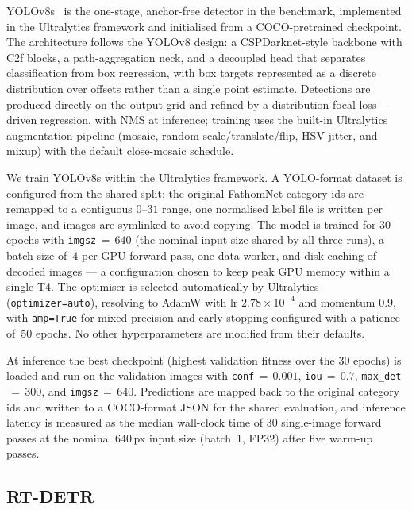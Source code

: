 \documentclass[11pt,a4paper,twocolumn]{article}
\begin{document}
YOLOv8s~\cite{yolov8_2023} is the one-stage, anchor-free detector in the
benchmark, implemented in the Ultralytics framework and initialised from a
COCO-pretrained checkpoint. The architecture follows the YOLOv8 design: a
CSPDarknet-style backbone with C2f blocks, a path-aggregation neck, and a
decoupled head that separates classification from box regression, with box
targets represented as a discrete distribution over offsets rather than a
single point estimate. Detections are produced directly on the output grid
and refined by a distribution-focal-loss---driven regression, with NMS at
inference; training uses the built-in Ultralytics augmentation pipeline
(mosaic, random scale/translate/flip, HSV jitter, and mixup) with the
default close-mosaic schedule.

We train YOLOv8s within the Ultralytics framework. A
YOLO-format dataset is configured from the shared split: the original FathomNet
category ids are remapped to a contiguous $0$--$31$ range, one normalised
label file is written per image, and images are symlinked to avoid copying.
The model is trained for 30 epochs with \texttt{imgsz}$\,{=}\,640$ (the nominal input size shared by all three runs), a batch size of~$4$ per GPU forward pass, one data worker, and disk caching of decoded images --- a configuration chosen to keep peak GPU memory within a single T4. The optimiser is selected automatically by Ultralytics
(\texttt{optimizer=auto}), resolving to AdamW with lr
$2.78\times10^{-4}$ and momentum $0.9$, with \texttt{amp=True} for mixed
precision and early stopping configured with a patience of~50 epochs. No
other hyperparameters are modified from their defaults.

At inference the best checkpoint (highest validation fitness over the 30 epochs) is loaded and run on the validation images with \texttt{conf}$\,{=}\,0.001$, \texttt{iou}$\,{=}\,0.7$, \texttt{max\_det}$\,{=}\,300$, and \texttt{imgsz}$\,{=}\,640$. Predictions are mapped back to the original category ids and written to a COCO-format JSON for the shared evaluation, and inference latency is measured as the median wall-clock time of 30 single-image forward passes at the nominal $640$\,px input size (batch~1, FP32) after five warm-up passes.

\subsection{RT-DETR}
\label{sec:methods-rtdetr-r18}
\end{document}
